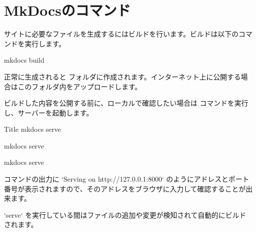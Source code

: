 \documentclass[../main]{subfiles}
\begin{document}
\setcounter{section}{3}
\section{MkDocsのコマンド}

サイトに必要なファイルを生成するにはビルドを行います。ビルドは以下のコマンドを実行します。

\begin{code}
mkdocs build
\end{code}

正常に生成されると  フォルダに作成されます。インターネット上に公開する場合はこのフォルダ内をアップロードします。

ビルドした内容を公開する前に、ローカルで確認したい場合は    コマンドを実行し、サーバーを起動します。


\begin{REDBOXT}{Title}
    mkdocs serve
\end{REDBOXT}

\begin{MATHBOX}
    mkdocs serve
\end{MATHBOX}

\begin{code}
mkdocs serve
\end{code}

コマンドの出力に `Serving on http://127.0.0.1:8000` のようにアドレスとポート番号が表示されますので、そのアドレスをブラウザに入力して確認することが出来ます。

`serve` を実行している間はファイルの追加や変更が検知されて自動的にビルドされます。
\end{document}
